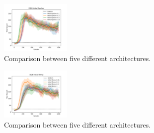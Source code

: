 \documentclass{article}
\begin{document}
   \begin{figure}[ht!]
      \centering
      \includegraphics[width=0.3\textwidth]{assets/fig_hp/epsilon.initial.png}
      \caption{Comparison between five different architectures.
      }
      \label{comp_epsilon}
   \end{figure}

   \begin{figure}[ht!]
      \centering
      \includegraphics[width=0.3\textwidth]{assets/fig_hp/temp.initial.png}
      \caption{Comparison between five different architectures.
      }
      \label{comp_temp}
   \end{figure}


\end{document}
